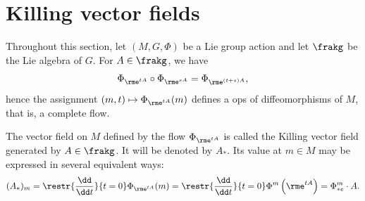\section{Killing vector fields}\label{sec Killing vectors}

Throughout this section, let $(M,G,\Phi)$ be a Lie group action and let $\frakg$ be the Lie algebra of $G$. For $A\in \frakg$, we have
\[\Phi_{\rme^{tA}}\circ\Phi_{\rme^{sA}}=\Phi_{\rme^{(t+s)A}},\]
hence the assignment $(m,t)\mapsto \Phi_{\rme^{tA}}(m)$ defines a \gls{ops} of diffeomorphisms of $M$, that is, a complete flow.

\begin{defn}
    The vector field on $M$ defined by the flow $\Phi_{\rme^{tA}}$ is called the Killing vector field generated by $A\in\frakg$. It will be denoted by $A_\ast$. Its value at $m\in M$ may be expressed in several equivalent ways:
    \[(A_\ast)_m=\restr{\frac{\dd}{\dd t}}{t=0}\Phi_{\rme^{tA}}(m)=\restr{\frac{\dd}{\dd t}}{t=0}\Phi^m\left(\rme^{tA}\right)=\Phi^m_{\ast e}\cdot A.\label{eq 6.2.1 RS1}\]
\end{defn}

